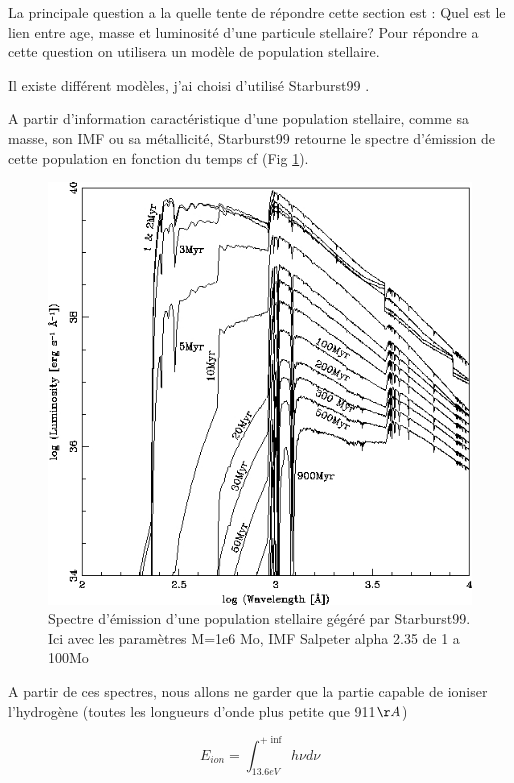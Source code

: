 La principale question a la quelle tente de répondre cette section est : Quel est le lien entre age, masse et luminosité d'une particule stellaire?
Pour répondre a cette question on utilisera un modèle de population stellaire.

Il existe différent modèles, j'ai choisi d'utilisé Starburst99 \citep{leitherer_starburst99:_1999}. %

A partir d'information caractéristique d'une population stellaire, comme sa masse, son IMF ou sa métallicité, Starburst99 retourne le spectre d'émission de cette population en fonction du temps cf (Fig \ref{fig:spectre_starburst}).

\begin{figure}[htbp]
        \includegraphics[width=.95\linewidth]{img/03/spectre_starburst.jpg} 
        \caption{Spectre d'émission d'une population stellaire gégéré par Starburst99.
        Ici avec les paramètres M=1e6 Mo, IMF Salpeter alpha 2.35 de 1 a 100Mo }
 		\label{fig:spectre_starburst}
\end{figure}

A partir de ces spectres, nous allons ne garder que la partie capable de ioniser l'hydrogène (toutes les longueurs d'onde plus petite que 911$\AA$) 



\begin{equation}
E_{ion} = \int_{13.6eV}^{+\inf} h \nu d\nu
\end{equation}

